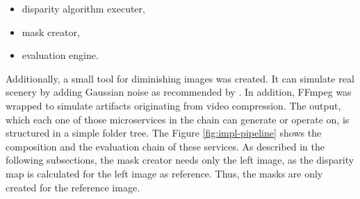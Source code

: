 \begin{itemize}
  \item disparity algorithm executer,
  \item mask creator,
  \item evaluation engine.
\end{itemize}

\noindent Additionally, a small tool for diminishing images was created.
It can simulate real scenery by adding Gaussian noise as recommended by \citep{richardt2010real}.
In addition, FFmpeg \citep{FFMPEG2010} was wrapped to simulate artifacts originating from video compression.
The output, which each one of those microservices in the chain can generate or operate on, is structured in a simple folder tree.
\newline\newline\noindent The Figure \ref{fig:impl-pipeline} shows the composition and the evaluation chain of these services.
As described in the following subsections, the mask creator needs only the left image, as the disparity map is calculated for the left image as reference.
Thus, the masks are only created for the reference image.

